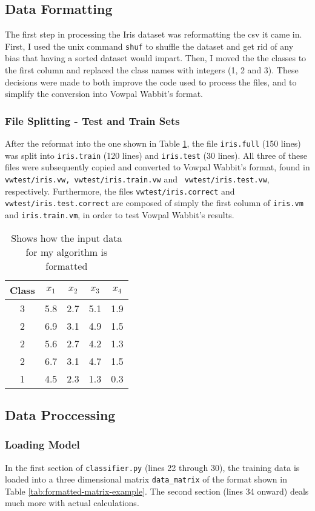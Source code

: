 \documentclass{article}
\begin{document}
\subsection{Data Formatting}
The first step in processing the Iris dataset was reformatting the csv it came in. First, I used the unix command \texttt{shuf} to shuffle the dataset and get rid of any bias that having a sorted dataset would impart. Then, I moved the the classes to the first column and replaced the class names with integers (1, 2 and 3). These decisions were made to both improve the code used to process the files, and to simplify the conversion into Vowpal Wabbit's format.

\subsubsection{File Splitting - Test and Train Sets}
After the reformat into the one shown in Table \ref{tab:formatted-dataset-example}, the file \texttt{iris.full} (150 lines) was split into \texttt{iris.train} (120 lines) and \texttt{iris.test} (30 lines). All three of these files were subsequently copied and converted to Vowpal Wabbit's format, found in \texttt{vwtest/iris.vw, vwtest/iris.train.vw} and \texttt{ vwtest/iris.test.vw}, respectively. Furthermore, the files \texttt{vwtest/iris.correct} and \texttt{vwtest/iris.test.correct} are composed of simply the first column of \texttt{iris.vm} and \texttt{iris.train.vm}, in order to test Vowpal Wabbit's results. 

\begin{table}[h]
  \centering
  \begin{tabular}{|c|c|c|c|c|}
  	\hline
    Class & $x_1$ & $x_2$ & $x_3$ & $x_4$ \\
    \hline
	3&5.8&2.7&5.1&1.9 \\
	2&6.9&3.1&4.9&1.5 \\
	2&5.6&2.7&4.2&1.3 \\
	2&6.7&3.1&4.7&1.5 \\
	1&4.5&2.3&1.3&0.3 \\
    \hline
  \end{tabular}
  \caption{Shows how the input data for my algorithm is formatted}
\label{tab:formatted-dataset-example}
\end{table}

\subsection{Data Proccessing}
\subsubsection{Loading Model} 
In the first section of \texttt{classifier.py} (lines 22 through 30), the training data is loaded into a three dimensional matrix \texttt{data\_matrix} of the format shown in Table \ref{tab:formatted-matrix-example}. The second section (lines 34 onward) deals much more with actual calculations.
\end{document}
